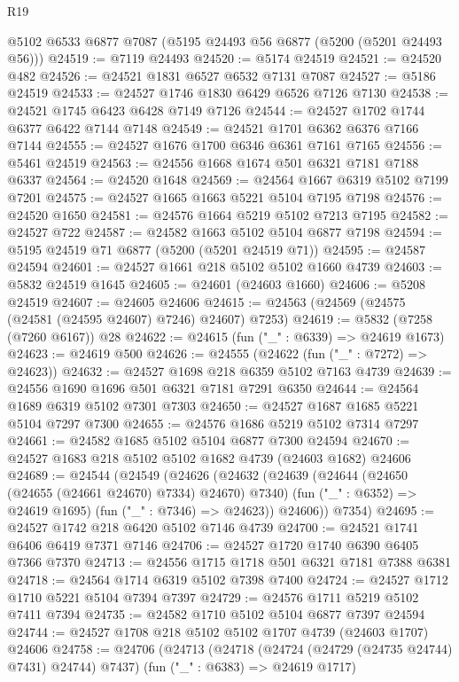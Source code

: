 \begin{lexlean}{R19}
\begin{coremodule}
{{{{{{{{{{{    @5102
    @6533
    @6877
    @7087
    (@5195 @24493 @56 @6877 (@5200 (@5201 @24493 @56)))
@24519 := @7119 @24493
@24520 := @5174 @24519
@24521 := @24520 @482
@24526 := @24521 @1831 @6527 @6532 @7131 @7087
@24527 := @5186 @24519
@24533 := @24527 @1746 @1830 @6429 @6526 @7126 @7130
@24538 := @24521 @1745 @6423 @6428 @7149 @7126
@24544 := @24527 @1702 @1744 @6377 @6422 @7144 @7148
@24549 := @24521 @1701 @6362 @6376 @7166 @7144
@24555 := @24527 @1676 @1700 @6346 @6361 @7161 @7165
@24556 := @5461 @24519
@24563 := @24556 @1668 @1674 @501 @6321 @7181 @7188 @6337
@24564 := @24520 @1648
@24569 := @24564 @1667 @6319 @5102 @7199 @7201
@24575 := @24527 @1665 @1663 @5221 @5104 @7195 @7198
@24576 := @24520 @1650
@24581 := @24576 @1664 @5219 @5102 @7213 @7195
@24582 := @24527 @722
@24587 := @24582 @1663 @5102 @5104 @6877 @7198
@24594 := @5195 @24519 @71 @6877 (@5200 (@5201 @24519 @71))
@24595 := @24587 @24594
@24601 := @24527 @1661 @218 @5102 @5102 @1660 @4739
@24603 := @5832 @24519 @1645
@24605 := @24601 (@24603 @1660)
@24606 := @5208 @24519
@24607 := @24605 @24606
@24615 := @24563 (@24569 (@24575 (@24581 (@24595 @24607) @7246) @24607) @7253)
@24619 := @5832 (@7258 (@7260 @6167)) @28
@24622 := @24615 (fun ("_" : @6339) => @24619 @1673)
@24623 := @24619 @500
@24626 := @24555 (@24622 (fun ("_" : @7272) => @24623))
@24632 := @24527 @1698 @218 @6359 @5102 @7163 @4739
@24639 := @24556 @1690 @1696 @501 @6321 @7181 @7291 @6350
@24644 := @24564 @1689 @6319 @5102 @7301 @7303
@24650 := @24527 @1687 @1685 @5221 @5104 @7297 @7300
@24655 := @24576 @1686 @5219 @5102 @7314 @7297
@24661 := @24582 @1685 @5102 @5104 @6877 @7300 @24594
@24670 := @24527 @1683 @218 @5102 @5102 @1682 @4739 (@24603 @1682) @24606
@24689 := @24544
    (@24549
      (@24626
        (@24632
          (@24639
            (@24644 (@24650 (@24655 (@24661 @24670) @7334) @24670) @7340)
            (fun ("_" : @6352) => @24619 @1695)
            (fun ("_" : @7346) => @24623))
          @24606))
      @7354)
@24695 := @24527 @1742 @218 @6420 @5102 @7146 @4739
@24700 := @24521 @1741 @6406 @6419 @7371 @7146
@24706 := @24527 @1720 @1740 @6390 @6405 @7366 @7370
@24713 := @24556 @1715 @1718 @501 @6321 @7181 @7388 @6381
@24718 := @24564 @1714 @6319 @5102 @7398 @7400
@24724 := @24527 @1712 @1710 @5221 @5104 @7394 @7397
@24729 := @24576 @1711 @5219 @5102 @7411 @7394
@24735 := @24582 @1710 @5102 @5104 @6877 @7397 @24594
@24744 := @24527 @1708 @218 @5102 @5102 @1707 @4739 (@24603 @1707) @24606
@24758 := @24706
    (@24713
      (@24718 (@24724 (@24729 (@24735 @24744) @7431) @24744) @7437)
      (fun ("_" : @6383) => @24619 @1717)
}}}}}}}}}}}
\end{coremodule}
\end{lexlean}
